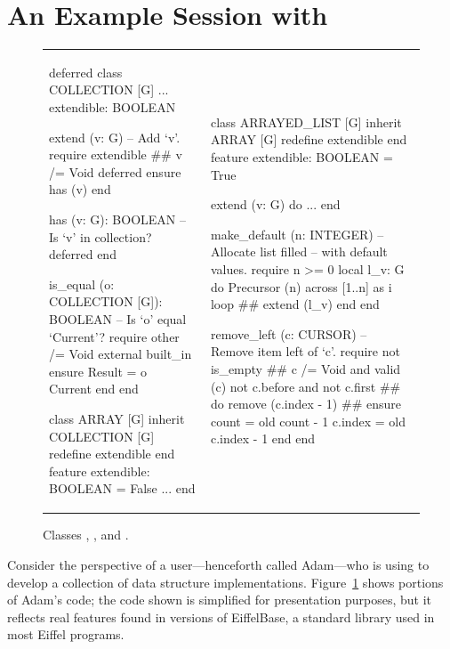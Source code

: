 
\section{An Example Session with \EVE} \label{sec:va:example}


\begin{figure}[!htb]
\centering
\begin{tabular}{ll}
{\begin{erunning}[numbers=left]
deferred class COLLECTION [G]
	...
	extendible: BOOLEAN

	extend (v: G)
		-- Add `v'.
	require
		extendible #\label{l:va:1}#
		v /= Void
	deferred
	ensure has (v) end

	has (v: G): BOOLEAN
		-- Is `v' in collection?
	deferred
	end

	is_equal (o: COLLECTION [G]):
			BOOLEAN
		-- Is `o' equal `Current'?
	require other /= Void
	external built_in
	ensure  Result = o ~ Current end
end

class ARRAY [G]
inherit COLLECTION [G]
	redefine extendible end
feature
	extendible: BOOLEAN = False
	...
end
\end{erunning}}
&
\hspace{3mm}
{\begin{erunning}[numbers=left,firstnumber=last]
class ARRAYED_LIST [G]
inherit ARRAY [G]
	redefine extendible end
feature
	extendible: BOOLEAN = True

	extend (v: G) do ... end

	make_default (n: INTEGER)
		-- Allocate list filled
		-- with default values.
	require n >= 0
	local l_v: G
	do
		Precursor (n)
		across [1..n] as i loop #\label{l:va:2}#
			extend (l_v)
		end
	end

	remove_left (c: CURSOR)
		-- Remove item left of `c'.
	require
		not is_empty #\label{l:va:4}#
		c /= Void and valid (c)
		not c.before and not c.first #\label{l:va:5}#
	do  remove (c.index - 1) #\label{l:va:3}#
	ensure
		count = old count - 1
		c.index = old c.index - 1
	end
end
\end{erunning}}
\end{tabular}
\caption{Classes , , and .}
\label{tab:motivating-example}
\end{figure}


Consider the perspective of a user---henceforth called Adam---who is using \EVE to develop a collection of data structure implementations.
Figure~\ref{tab:motivating-example} shows portions of Adam's code; the code shown is simplified for presentation purposes, but it reflects real features found in versions of EiffelBase, a standard library used in most Eiffel programs.

